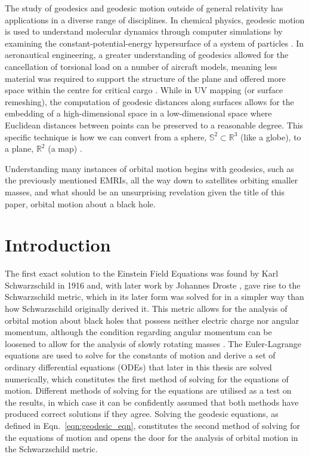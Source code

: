 The study of geodesics and geodesic motion outside of general relativity has applications in a diverse range of disciplines.
In chemical physics, geodesic motion is used to understand molecular dynamics through computer simulations by examining the constant-potential-energy hypersurface of a system of particles \cite{chemPhysApp}.
In aeronautical engineering, a greater understanding of geodesics allowed for the cancellation of torsional load on a number of aircraft models, meaning less material was required to support the structure of the plane and offered more space within the centre for critical cargo \cite{aircraftApp}.
While in UV mapping (or surface remeshing), the computation of geodesic distances along surfaces allows for the embedding of a high-dimensional space in a low-dimensional space where Euclidean distances between points can be preserved to a reasonable degree.
This specific technique is how we can convert from a sphere, $\mathbb{S}^2\subset \mathbb{R}^3$ (like a globe), to a plane, $\mathbb{R}^2$ (a map) \cite{surfaceMeshApp, uvMapApp}.


Understanding many instances of orbital motion begins with geodesics, such as the previously mentioned EMRIs, all the way down to satellites orbiting smaller masses, and what should be an unsurprising revelation given the title of this paper, orbital motion about a black hole.


\section{Introduction}\label{sec:introduction}

The first exact solution to the Einstein Field Equations was found by Karl Schwarzschild in 1916 \cite{schwarz1916} and, with later work by Johannes Droste \cite{drosteSchwarz}, gave rise to the Schwarzschild metric, which in its later form was solved for in a simpler way than how Schwarzschild originally derived it.
This metric allows for the analysis of orbital motion about black holes that possess neither electric charge nor angular momentum, although the condition regarding angular momentum can be loosened to allow for the analysis of slowly rotating masses \cite{schwarzSlowRot}.
The Euler-Lagrange equations are used to solve for the constants of motion and derive a set of ordinary differential equations (ODEs) that later in this thesis are solved numerically, which constitutes the first method of solving for the equations of motion.
Different methods of solving for the equations are utilised as a test on the results, in which case it can be confidently assumed that both methods have produced correct solutions if they agree.
Solving the geodesic equations, as defined in Eqn.~\eqref{eqn:geodesic_eqn}, constitutes the second method of solving for the equations of motion and opens the door for the analysis of orbital motion in the Schwarzschild metric.

